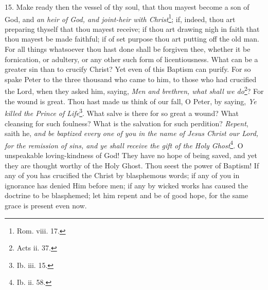15. Make ready then the vessel of thy soul, that thou mayest become a son of God, and \emph{an heir of God, and joint-heir with Christ}\footnote{Rom. viii. 17.}; if, indeed, thou art preparing thyself that thou mayest receive; if thou art drawing nigh in faith that thou mayest be made faithful; if of set purpose thou art putting off the old man. For all things whatsoever thou hast done shall be forgiven thee, whether it be fornication, or adultery, or any other such form of licentiousness. What can be a greater sin than to crucify Christ? Yet even of this Baptism can purify. For so spake Peter to the three thousand who came to him, to those who had crucified the Lord, when they asked him, saying, \emph{Men and brethren, what shall we do}\footnote{Acts ii. 37.}? For the wound is great. Thou hast made us think of our fall, O Peter, by saying, \emph{Ye killed the Prince of Life}\footnote{Ib. iii. 15.}. What salve is there for so great a wound? What cleansing for such foulness? What is the salvation for such perdition? \emph{Repent}, saith he, \emph{and be baptized every one of you in the name of Jesus Christ our Lord, for the remission of sins, and ye shall receive the gift of the Holy Ghost}\footnote{Ib. ii. 58.}. O unspeakable loving-kindness of God! They have no hope of being saved, and yet they are thought worthy of the Holy Ghost. Thou seest the power of Baptism! If any of you has crucified the Christ by blasphemous words; if any of you in ignorance has denied Him before men; if any by wicked works has caused the doctrine to be blasphemed; let him repent and be of good hope, for the same grace is present even now.

